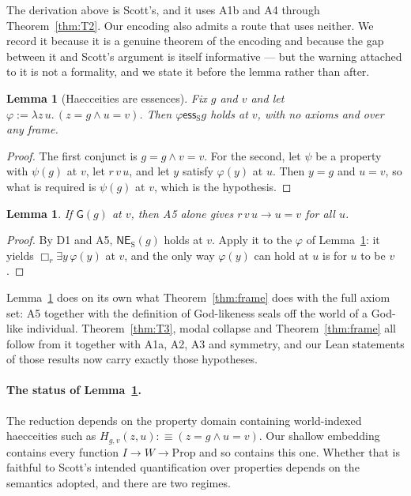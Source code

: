 \documentclass[11pt]{article}
\theoremstyle{plain}
\newtheorem{lemma}[theorem]{Lemma}
\theoremstyle{definition}
\newcommand{\Prp}{\mathrm{Prop}}
\newcommand{\esss}{\mathrel{\mathsf{ess}_{\mathrm{S}}}}
\newcommand{\NES}{\mathsf{NE}_{\mathrm{S}}}
\newcommand{\Gd}{\mathsf{G}}
\begin{document}
The derivation above is Scott's, and it uses A1b and A4 through
Theorem~\ref{thm:T2}. Our encoding also admits a route that uses neither. We
record it because it is a genuine theorem of the encoding and because the gap
between it and Scott's argument is itself informative --- but the warning
attached to it is not a formality, and we state it before the lemma rather
than after.

\begin{lemma}[Haecceities are essences]\label{lem:haecceity}
Fix $g$ and $v$ and let $\varphi := \lambda z\,u.\,(z = g \wedge u = v)$. Then
$\varphi \esss g$ holds at $v$, with no axioms and over any frame.
\end{lemma}

\begin{proof}
The first conjunct is $g = g \wedge v = v$. For the second, let $\psi$ be a
property with $\psi(g)$ at $v$, let $r\,v\,u$, and let $y$ satisfy
$\varphi(y)$ at $u$. Then $y = g$ and $u = v$, so what is required is
$\psi(g)$ at $v$, which is the hypothesis.
\end{proof}

\begin{lemma}\label{lem:blind}
If $\Gd(g)$ at $v$, then A5 alone gives $r\,v\,u \to u = v$ for all $u$.
\end{lemma}

\begin{proof}
By D1 and A5, $\NES(g)$ holds at $v$. Apply it to the $\varphi$ of
Lemma~\ref{lem:haecceity}: it yields $\Box_r \exists y\, \varphi(y)$ at $v$,
and the only way $\varphi(y)$ can hold at $u$ is for $u$ to be $v$.
\end{proof}

\noindent
Lemma~\ref{lem:blind} does on its own what Theorem~\ref{thm:frame} does with
the full axiom set: A5 together with the definition of God-likeness seals off
the world of a God-like individual. Theorem~\ref{thm:T3}, modal collapse and
Theorem~\ref{thm:frame} all follow from it together with A1a, A2, A3 and
symmetry, and our Lean statements of those results now carry exactly those
hypotheses.

\paragraph{The status of Lemma~\ref{lem:haecceity}.} The reduction depends on
the property domain containing world-indexed haecceities such as
$H_{g,v}(z,u) :\equiv (z = g \wedge u = v)$. Our shallow embedding contains
every function $I \to W \to \Prp$ and so contains this one. Whether that is
faithful to Scott's intended quantification over properties depends on the
semantics adopted, and there are two regimes.
\end{document}
